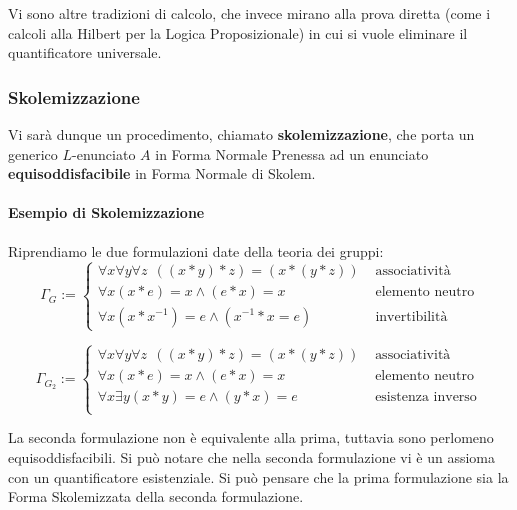 Vi sono altre tradizioni di calcolo, che invece mirano alla prova diretta 
(come i calcoli alla Hilbert per la Logica Proposizionale) in cui si vuole 
eliminare il quantificatore universale. 

\subsubsection{Skolemizzazione}
Vi sarà dunque un procedimento, chiamato \textbf{skolemizzazione}, 
che porta un generico $L$-enunciato $A$ in 
Forma Normale Prenessa ad un enunciato \textbf{equisoddisfacibile} in Forma Normale 
di Skolem.

\paragraph{Esempio di Skolemizzazione}
Riprendiamo le due formulazioni date della teoria dei gruppi: 
$$
        \Gamma_G := 
                \begin{cases}
                        \forall x \forall y \forall z  ~~ ((x * y)*z) = (x*(y*z))  & \text{ associatività}\\
                        \forall x (x * e) = x \land (e * x) = x  & \text{ elemento neutro}\\
                        \forall x (x * x^{-1}) = e \land (x^{-1} * x = e) & \text{ invertibilità}
                \end{cases}
$$

$$
        \Gamma_{G_2} := 
                \begin{cases}
                        \forall x \forall y \forall z  ~~ ((x * y)*z) = (x*(y*z)) & \text{ associatività}\\
                        \forall x (x * e) = x \land (e * x) = x & \text{ elemento neutro } \\
                        \forall x \exists y (x * y) = e \land (y * x) = e & \text{ esistenza inverso} \\
                \end{cases}
$$

La seconda formulazione non è equivalente alla prima, tuttavia sono perlomeno 
equisoddisfacibili. Si può notare che nella seconda formulazione vi è un assioma 
con un quantificatore esistenziale. Si può pensare che la prima 
formulazione sia la Forma Skolemizzata della seconda formulazione. 
 

